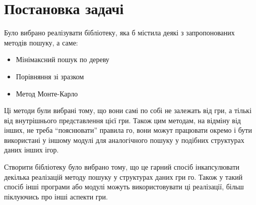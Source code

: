 \documentclass[a4paper,14pt]{report}
\begin{document}
\section{Постановка задачі}
Було вибрано реалізувати бібліотеку, яка б містила деякі з запропонованих методів пошуку, а саме:
\begin{itemize}
	\item Мінімаксний пошук по дереву
	\item Порівняння зі зразком
	\item Метод Монте-Карло
\end{itemize}
Ці методи були вибрані тому, що вони самі по собі не залежать від гри, а тількі від внутрішнього представлення цієї гри. Також цим методам, на відміну від інших, не треба ``пояснювати'' правила го, вони можут працювати окремо і бути використані у іншому модулі для аналогічного пошуку у подібних структурах даних інших ігор.

Створити бібліотеку було вибрано тому, що це гарний спосіб інкапсулювати декілька реалізацій методу пошуку у структурах даних гри го. Також у такий спосіб інші програми або модулі можуть використовувати ці реалізації, більш піклуючись про інші аспекти гри.
\end{document}

